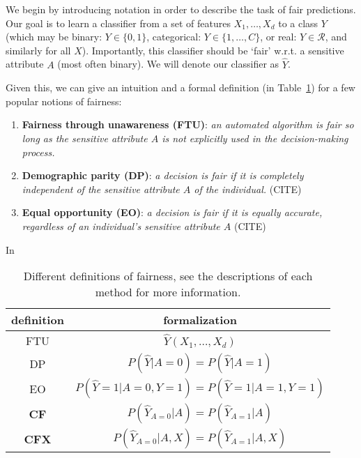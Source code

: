 We begin by introducing notation in order to describe the task of fair predictions. Our goal is to learn a classifier from a set of features $X_1,\ldots,X_d$ to a class $Y$ (which may be binary: $Y \in \{0,1\}$, categorical: $Y \in \{1,\ldots,C\}$, or real: $Y \in \mathcal{R}$, and similarly for all $X$). Importantly, this classifier should be `fair' w.r.t. a sensitive attribute $A$ (most often binary). We will denote our classifier as $\hat{Y}$.

Given this, we can give an intuition and a formal definition (in Table~\ref{table.fair}) for a few popular notions of fairness:
\begin{enumerate}
    \item \textbf{Fairness through unawareness (FTU)}: \emph{an automated algorithm is fair so long as the sensitive attribute $A$ is not explicitly used in the decision-making process.} %
    \item \textbf{Demographic parity (DP)}: \emph{a decision is fair if it is completely independent of the sensitive attribute $A$ of the individual.} 
    (CITE)
    \item \textbf{Equal opportunity (EO)}: \emph{a decision is fair if it is equally accurate, regardless of an individual's sensitive attribute $A$} (CITE)
\end{enumerate}

In %

\begin{table}[t]
\vspace{-2ex}
\caption{Different definitions of fairness, see the descriptions of each method for more information.}
\vspace{-3ex}
\label{table.fair}
\begin{center}
\resizebox{\columnwidth}{!}
{
\begin{sc}
\footnotesize
\begin{tabular}{c|c}
\hline
\hline
definition & formalization  \\
\hline
FTU & $\hat{Y}(X_1, \ldots, X_d)$  \\ 
DP  & $P(\hat{Y} | A=0) = P(\hat{Y} | A=1)$ \\
EO  & $P(\hat{Y} = 1 | A = 0, Y = 1) = P(\hat{Y} = 1 | A=1, Y = 1)$ \\
\hline
\textbf{CF} & $P(\hat{Y}_{A=0} | A) = P(\hat{Y}_{A=1} | A)$ \\
\textbf{CFX} & $P(\hat{Y}_{A=0} | A, X) = P(\hat{Y}_{A=1} | A, X)$ \\
\hline
\end{tabular}
\end{sc}
}
\end{center}
\vspace{-4ex}
\end{table}


